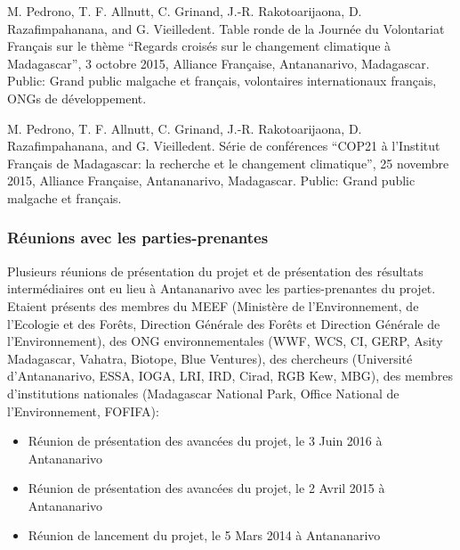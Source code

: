 \documentclass[12pt,]{article}
\providecommand{\tightlist}{%
  \setlength{\itemsep}{0pt}\setlength{\parskip}{0pt}}
\begin{document}
M. Pedrono, T. F. Allnutt, C. Grinand, J.-R. Rakotoarijaona, D.
Razafimpahanana, and G. Vieilledent. Table ronde de la Journée du
Volontariat Français sur le thème ``Regards croisés sur le changement
climatique à Madagascar'', 3 octobre 2015, Alliance Française,
Antananarivo, Madagascar. Public: Grand public malgache et français,
volontaires internationaux français, ONGs de développement.

M. Pedrono, T. F. Allnutt, C. Grinand, J.-R. Rakotoarijaona, D.
Razafimpahanana, and G. Vieilledent. Série de conférences ``COP21 à
l'Institut Français de Madagascar: la recherche et le changement
climatique'', 25 novembre 2015, Alliance Française, Antananarivo,
Madagascar. Public: Grand public malgache et français.

\hypertarget{reunions-avec-les-parties-prenantes}{%
\subsubsection{Réunions avec les
parties-prenantes}\label{reunions-avec-les-parties-prenantes}}

Plusieurs réunions de présentation du projet et de présentation des
résultats intermédiaires ont eu lieu à Antananarivo avec les
parties-prenantes du projet. Etaient présents des membres du MEEF
(Ministère de l'Environnement, de l'Ecologie et des Forêts, Direction
Générale des Forêts et Direction Générale de l'Environnement), des ONG
environnementales (WWF, WCS, CI, GERP, Asity Madagascar, Vahatra,
Biotope, Blue Ventures), des chercheurs (Université d'Antananarivo,
ESSA, IOGA, LRI, IRD, Cirad, RGB Kew, MBG), des membres d'institutions
nationales (Madagascar National Park, Office National de
l'Environnement, FOFIFA):

\begin{itemize}
\tightlist
\item
  Réunion de présentation des avancées du projet, le 3 Juin 2016 à
  Antananarivo
\item
  Réunion de présentation des avancées du projet, le 2 Avril 2015 à
  Antananarivo
\item
  Réunion de lancement du projet, le 5 Mars 2014 à Antananarivo
\end{itemize}
\end{document}
